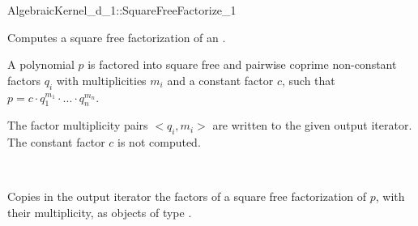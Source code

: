 \begin{ccRefFunctionObjectConcept}{AlgebraicKernel_d_1::SquareFreeFactorize_1}

\ccDefinition
Computes a square free factorization of an
.

A polynomial $p$ is factored into square free and pairwise 
coprime non-constant factors $q_i$ with multiplicities $m_i$ 
and a constant factor $c$, such that 
$p = c  \cdot  q_1^{m_1}  \cdot  ...  \cdot  q_n^{m_n}$.

The factor multiplicity pairs $<q_i,m_i>$ are written to the 
given output iterator. The constant factor $c$ is not computed. 

\ccRefines 
{}\\

\ccOperations \ccThree{+++++++++}{+++++++++}{}

{Copies in the output iterator the factors of a square free 
factorization of $p$, with their multiplicity, as objects of type 
.}

\ccSeeAlso
{}\\
\\

\end{ccRefFunctionObjectConcept}
